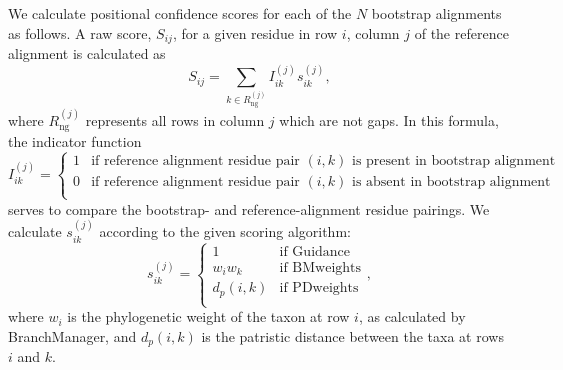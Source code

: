 \documentclass[10pt]{article}
\begin{document}
We calculate positional confidence scores for each of the $N$ bootstrap alignments as follows. A raw score, $S_{ij}$, for a given residue in row $i$, column $j$ of the reference alignment is calculated as \begin{equation} S_{ij} = \sum\limits_{k \in R_\text{ng}^{(j)}} I_{ik}^{(j)} s_{ik}^{(j)}    ,\end{equation} where $R_\text{ng}^{(j)}$ represents all rows in column $j$ which are not gaps.
In this formula, the indicator function 
\begin{equation}I_{ik}^{(j)} = \left\{ \begin{array}{rl}

              1                         &\mbox{if reference alignment residue pair $(i, k)$ is present in bootstrap alignment} \\
              0            &\mbox{if reference alignment residue pair $(i, k)$ is absent in bootstrap alignment} \\
                     \end{array} \right. 
\end{equation}
serves to compare the bootstrap- and reference-alignment residue pairings.
We calculate $s_{ik}^{(j)}$ according to the given scoring algorithm:
\begin{equation}
s_{ik}^{(j)} = \left\{ \begin{array}{rl}

              1                         &\mbox{if Guidance} \\
              w_iw_k              &\mbox{if BMweights} \\
              d_p(i,k)              &\mbox{if PDweights} \\
                     \end{array} \right.,
\end{equation} where $w_i$ is the phylogenetic weight of the taxon at row $i$, as calculated by BranchManager, and $d_p(i, k)$ is the patristic distance between the taxa at rows $i$ and $k$. 
\end{document}
